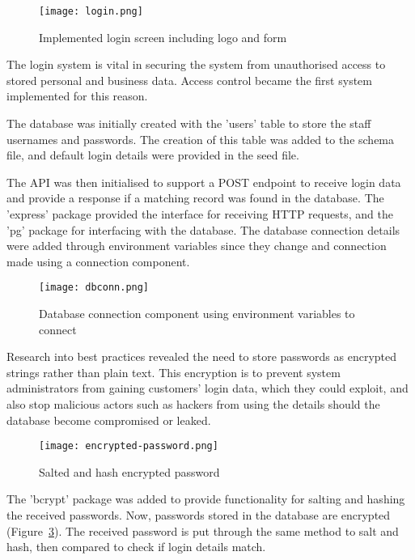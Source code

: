 \begin{figure}[ht!]
    \centerline{\texttt{[image: login.png]}}
    \caption{Implemented login screen including logo and form}
    \label{fig:login}
\end{figure}


The login system \parencite{adams_basic_2018} \parencite{macharia_session_2021} is vital in securing the system from unauthorised access to stored personal and business data. Access control became the first system implemented for this reason.

The database was initially created with the 'users' table to store the staff usernames and passwords. The creation of this table was added to the schema file, and default login details were provided in the seed file.

The API was then initialised to support a POST endpoint to receive login data and provide a response if a matching record was found in the database. The 'express' package provided the interface for receiving HTTP requests, and the 'pg' package for interfacing with the database. The database connection details were added through environment variables since they change and connection made using a connection component.

\begin{figure}[ht!]
    \centerline{\texttt{[image: dbconn.png]}}
    \caption{Database connection component using environment variables to connect}
    \label{fig:dbconnect}
\end{figure}

Research into best practices \parencite{page_how_2023} revealed the need to store passwords as encrypted strings \parencite{gauravaram_security_2012} rather than plain text. This encryption is to prevent system administrators from gaining customers' login data, which they could exploit, and also stop malicious actors such as hackers from using the details should the database become compromised or leaked.

\begin{figure}[ht!]
    \centerline{\texttt{[image: encrypted-password.png]}}
    \caption{Salted and hash encrypted password}
    \label{fig:password}
\end{figure}

The 'bcrypt' package was added to provide functionality for salting and hashing the received passwords. Now, passwords stored in the database are encrypted (Figure~\ref{fig:password}). The received password is put through the same method to salt and hash, then compared to check if login details match.

